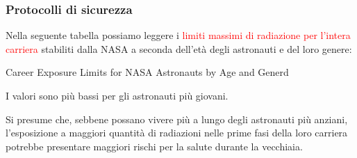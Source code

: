 \documentclass[9pt]{beamer}
\begin{document}
\begin{frame} [fragile]
	\frametitle{Protocolli di sicurezza}
	Nella seguente tabella\cite{Nasa1} possiamo leggere i \textcolor{red}{limiti massimi di radiazione per l'intera carriera} stabiliti dalla NASA a seconda dell'et\`a degli astronauti e del loro genere:
 \begin{exampleblock}{Career Exposure Limits for NASA Astronauts by Age and Generd}
\begin{center}
\linebreak
\end{center} 
\end{exampleblock}

I valori sono pi\`u bassi per gli astronauti pi\`u giovani. 
\newline

Si presume che, sebbene possano vivere pi\`u a lungo degli astronauti pi\`u anziani, l'esposizione a maggiori quantit\`a di radiazioni nelle prime fasi della loro carriera potrebbe presentare maggiori rischi per la salute durante la vecchiaia.

\end{frame}
	
\end{document}
